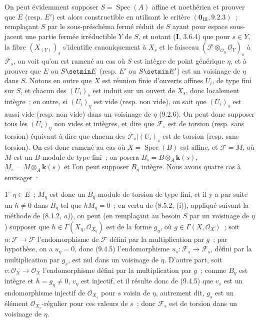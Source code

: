 On peut évidemment supposer $S=\operatorname{Spec}(A)$ affine et noethérien et
prouver que $E$ (resp. $E'$) est alors constructible en utilisant le critère
$(\mathbf 0_{\mathrm{III}},9.2.3)$~; remplaçant $S$ par le sous-préschéma fermé
réduit de $S$ ayant pour espace sous-jacent une partie fermée irréductible $Y$
de $S$, et notant (\textbf{I}, 3.6.4) que pour $s\in Y$, la fibre
$(X_{(Y)})_s$ s'identifie canoniquement à $X_s$ et le faisceau
$(\mathcal F\otimes_{\mathcal O_S}\mathcal O_Y)_s$ à $\mathcal F_s$, on voit
qu'on est ramené au cas où $S$ est intègre de point générique $\eta$, et à
prouver que $E$ ou $S\setmin E$ (resp. $E'$ ou $S\setmin E'$) est un voisinage de $\eta$
dans $S$. Notons en outre que $X$ est réunion finie d'ouverts affines $U_i$,
de type fini sur $S$, et chacun des $(U_i)_s$ est induit sur un ouvert de
$X_s$, donc localement intègre~; en outre, si $(U_i)_\eta$ est vide (resp. non
vide), on sait que $(U_i)_s$ est aussi vide (resp. non vide) dans un voisinage
de $\eta$ (9.2.6). On peut donc supposer tous les $(U_i)_\eta$ non vides et
intègres, et dire que $\mathcal F_s$ est de torsion (resp. sans torsion)
équivaut à dire que chacun des $\mathcal F_s|(U_i)_s$ est de torsion (resp.
sans torsion). On est donc ramené au cas où $X=\operatorname{Spec}(B)$ est
affine, et $\mathcal F=\widetilde M$, où $M$ est un $B$-module de type fini~;
on posera $B_s=B\otimes_A \boldsymbol{k}(s)$, $M_s=M\otimes_A \boldsymbol{k}(s)$ et l'on peut supposer
$B_\eta$ intègre. Nous avons quatre cas à envisager~:

$1^\circ$ $\eta\in E$~; $M_\eta$ est donc un $B_\eta$-module de torsion de
type fini, et il y a par suite un $h\neq0$ dans $B_\eta$ tel que
$hM_\eta=0$~; en vertu de (8.5.2, (i)), appliqué suivant la méthode
de (8.1.2, \emph{a)}), on peut (en remplaçant au besoin $S$ par un voisinage
de $\eta$) supposer que $h\in\Gamma(X_\eta,\mathcal O_{X_\eta})$ est de la
forme $g_\eta$, où $g\in\Gamma(X,\mathcal O_X)$~; soit
$u:\mathcal F\to\mathcal F$ l'endomorphisme de $\mathcal F$ défini par la
multiplication par $g$~; par hypothèse, on a $u_\eta=0$, donc (9.4.5)
l'endomorphisme $u_s:\mathcal F_s\to\mathcal F_s$, défini par la multiplication
par $g_s$, est nul dans un voisinage de $\eta$. D'autre part, soit
$v:\mathcal O_X\to\mathcal O_X$ l'endomorphisme défini par la multiplication
par $g$~; comme $B_\eta$ est intègre et $h=g_\eta\neq0$, $v_\eta$ est injectif,
et il résulte donc de (9.4.5) que $v_s$ est un endomorphisme injectif de
$\mathcal O_{X_s}$ pour $s$ voisin de $\eta$, autrement dit, $g_s$ est un
élément $\mathcal O_{X_s}$-régulier pour ces valeurs de $s$~; donc
$\mathcal F_s$ est de torsion dans un voisinage de $\eta$.

